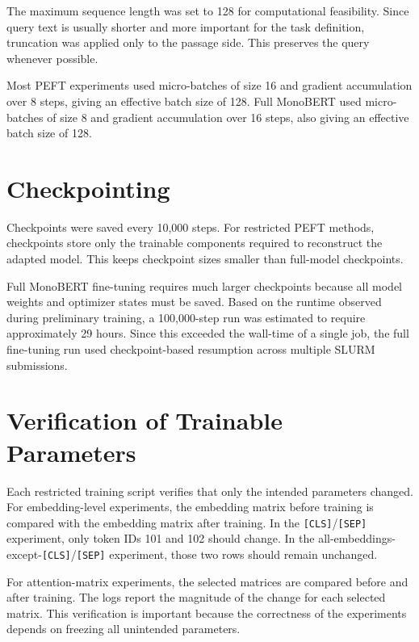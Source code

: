 The maximum sequence length was set to 128 for computational feasibility. Since query text is usually shorter and more important for the task definition, truncation was applied only to the passage side. This preserves the query whenever possible.

Most PEFT experiments used micro-batches of size 16 and gradient accumulation over 8 steps, giving an effective batch size of 128. Full MonoBERT used micro-batches of size 8 and gradient accumulation over 16 steps, also giving an effective batch size of 128.

\section{Checkpointing}
\label{sec:experiments_checkpointing}

Checkpoints were saved every 10,000 steps. For restricted PEFT methods, checkpoints store only the trainable components required to reconstruct the adapted model. This keeps checkpoint sizes smaller than full-model checkpoints.

Full MonoBERT fine-tuning requires much larger checkpoints because all model weights and optimizer states must be saved. Based on the runtime observed during preliminary training, a 100,000-step run was estimated to require approximately 29 hours. Since this exceeded the wall-time of a single job, the full fine-tuning run used checkpoint-based resumption across multiple SLURM submissions.

\section{Verification of Trainable Parameters}
\label{sec:experiments_verification}

Each restricted training script verifies that only the intended parameters changed. For embedding-level experiments, the embedding matrix before training is compared with the embedding matrix after training. In the \texttt{[CLS]}/\texttt{[SEP]} experiment, only token IDs 101 and 102 should change. In the all-embeddings-except-\texttt{[CLS]}/\texttt{[SEP]} experiment, those two rows should remain unchanged.

For attention-matrix experiments, the selected matrices are compared before and after training. The logs report the magnitude of the change for each selected matrix. This verification is important because the correctness of the experiments depends on freezing all unintended parameters.

